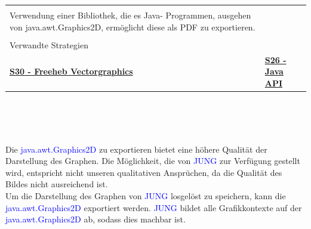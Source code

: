 \documentclass[enabledeprecatedfontcommands,fontsize=11pt,paper=a4,twoside]{scrartcl}
\newcounter{one}
\newcommand{\cb}[1]{{\textcolor{blue}{#1}}}
\begin{document}
\begin{tabular} {|p{8cm} p{8cm}|}
{{				\textbf{\cb{\hypertarget{hhh}{S29 - java.awt.Graphics2D}}}: \\
				Verwendung einer Bibliothek, die es Java- Programmen, ausgehen von java.awt.Graphics2D, ermöglicht diese als PDF zu exportieren. \\
		} }\\ [4ex] \hline
		\multicolumn{2}{|l|}{Verwandte Strategien} \\
		\textbf{\hyperlink{iii}{S30 - Freeheb Vectorgraphics}}&
		\textbf{\hyperlink{ggg}{S26 - Java API}} 
		\\\hline
	\end{tabular}\\ \\ \\
	\begin{onehalfspace}
		Die \cb{java.awt.Graphics2D} zu exportieren bietet eine höhere Qualität der Darstellung des Graphen. Die Möglichkeit, die von \cb{JUNG} zur Verfügung gestellt wird, entspricht nicht unseren qualitativen Ansprüchen, da die Qualität des Bildes nicht ausreichend ist. \\
		Um die Darstellung des Graphen von \cb{JUNG} losgelöst zu speichern, kann die \cb{java.awt.Graphics2D} exportiert werden. \cb{JUNG} bildet alle Grafikkontexte auf der \cb{java.awt.Graphics2D} ab, sodass dies machbar ist.
	\end{onehalfspace}
	\newpage
\end{document}
